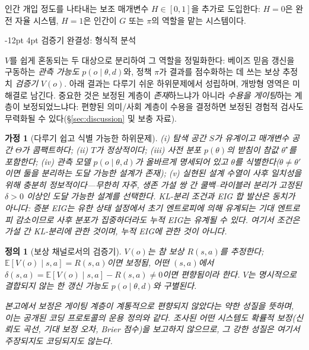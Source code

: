 \documentclass[11pt]{article}
\makeatletter
\renewcommand\subsection{\@startsection{subsection}{2}{\z@}%
  {-12pt \@plus -2pt \@minus -2pt}%
  {4pt \@plus 1pt}%
  {\normalfont\normalsize\bfseries}}
\newtheorem{definition}{정의}
\newtheorem{assumption}{가정}
\makeatother
\begin{document}
인간 개입 정도를 나타내는 보조 매개변수 $H \in [0,1]$을 추가로 도입한다: $H=0$은 완전 자율 시스템, $H=1$은 인간이 $G$ 또는 $\pi$의 역할을 맡는 시스템이다.

\subsection{검증기 완결성: 형식적 분석}
\label{sec:vformal}

$V$를 쉽게 혼동되는 두 대상으로 분리하여 그 역할을 정밀화한다: 베이즈 믿음 갱신을 구동하는 \emph{관측 가능도} $p(o \mid \theta, d)$와, 정책 $\pi$가 결과를 점수화하는 데 쓰는 보상 추정치 \emph{검증기} $V(o)$. 아래 결과는 다루기 쉬운 하위문제에서 성립하며, 개방형 영역은 미해결로 남긴다. 중요한 것은 보정된 계층이 \emph{존재}하느냐가 아니라 \emph{수용을 게이팅}하는 계층이 보정되었느냐다: 편향된 의미/사회 계층이 수용을 결정하면 보정된 경험적 검사도 무력화될 수 있다(§\ref{sec:discussion} 및 보충 자료).

\begin{assumption}[다루기 쉽고 식별 가능한 하위문제]
\label{asm:tract}
(i) 탐색 공간 $S$가 유계이고 매개변수 공간 $\Theta$가 콤팩트하다; (ii) $T$가 정상적이다; (iii) 사전 분포 $p(\theta)$의 받침이 참값 $\theta^\star$를 포함한다; (iv) 관측 모델 $p(o \mid \theta, d)$가 올바르게 명세되어 있고 $\theta$를 식별한다($\theta \neq \theta'$이면 둘을 분리하는 도달 가능한 설계가 존재); (v) 실현된 설계 수열이 사후 일치성을 위해 \emph{충분히 정보적}이다---무한히 자주, 생존 가설 쌍 간 쿨백--라이블러 분리가 고정된 $\delta>0$ 이상인 도달 가능한 설계를 선택한다. KL-분리 조건과 EIG 합 발산은 동치가 아니다: 증분 EIG는 유한 상태 설정에서 초기 엔트로피에 의해 유계되는 기대 엔트로피 감소이므로 사후 분포가 집중하더라도 누적 EIG는 유계될 수 있다. 여기서 조건은 가설 간 KL-분리에 관한 것이며, 누적 EIG에 관한 것이 아니다.
\end{assumption}

\begin{definition}[보상 채널로서의 검증기]
\label{def:channel}
$V(o)$는 참 보상 $R(s,a)$를 추정한다; $\mathbb{E}[V(o)\mid s,a]=R(s,a)$이면 \emph{보정됨}, 어떤 $(s,a)$에서 $\delta(s,a)=\mathbb{E}[V(o)\mid s,a]-R(s,a)\neq 0$이면 \emph{편향됨}이라 한다. $V$는 명시적으로 결합되지 않는 한 갱신 가능도 $p(o\mid\theta,d)$와 구별된다.

본고에서 \emph{보정}은 게이팅 계층이 계통적으로 편향되지 않았다는 약한 성질을 뜻하며, 이는 공개된 코딩 프로토콜의 운용 정의와 같다. 조사된 어떤 시스템도 확률적 보정(신뢰도 곡선, 기대 보정 오차, Brier 점수)을 보고하지 않으므로, 그 강한 성질은 여기서 주장되지도 코딩되지도 않는다.
\end{definition}
\end{document}
